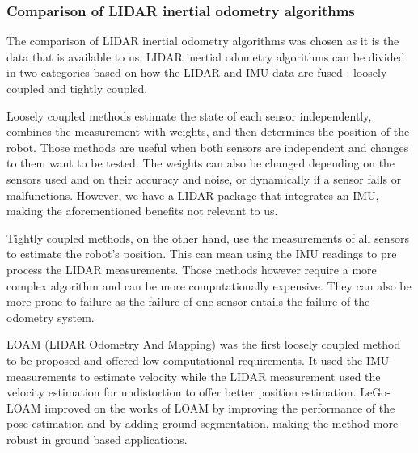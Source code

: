 \documentclass[11pt]{article}
\begin{document}
        \subsubsection{Comparison of LIDAR inertial odometry algorithms}

        The comparison of LIDAR inertial odometry algorithms was chosen as it is the data that is available to us. LIDAR inertial odometry algorithms can be divided in two categories based on how the LIDAR and IMU data are fused : loosely coupled and tightly coupled.

        Loosely coupled methods estimate the state of each sensor independently, combines the measurement with weights, and then determines the position of the robot. Those methods are useful when both sensors are independent and changes to them want to be tested. The weights can also be changed depending on the sensors used and on their accuracy and noise, or dynamically if a sensor fails or malfunctions. However, we have a LIDAR package that integrates an IMU, making the aforementioned benefits not relevant to us.

        Tightly coupled methods, on the other hand, use the measurements of all sensors to estimate the robot's position. This can mean using the IMU readings to pre process the LIDAR measurements. Those methods however require a more complex algorithm and can be more computationally expensive. They can also be more prone to failure as the failure of one sensor entails the failure of the odometry system.


        LOAM (LIDAR Odometry And Mapping) \cite{lee2024lidar} was the first loosely coupled method to be proposed and offered low computational requirements. It used the IMU measurements to estimate velocity while the LIDAR measurement used the velocity estimation for undistortion to offer better position estimation. LeGo-LOAM \cite{shan2018lego} improved on the works of LOAM by improving the performance of the pose estimation and by adding ground segmentation, making the method more robust in ground based applications.
\end{document}

